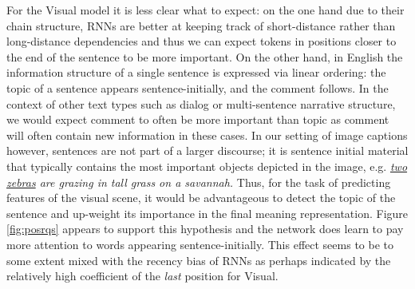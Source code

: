 For the {\sc Visual} model it is less clear what to
expect: on the one hand due to their chain structure,
RNNs are better at keeping track of
short-distance rather than long-distance dependencies and thus we can expect
tokens in positions closer to the end of the sentence to be more important.
On the other hand, in English the information structure of a single
sentence is expressed via linear ordering: the {\sc topic} of a
sentence appears sentence-initially, and the {\sc comment} follows.
In the context of other text types such as dialog or multi-sentence \label{edit:topiccomment}
narrative structure, we would expect {\sc comment} to often be more
important than {\sc topic} as {\sc comment} will often
contain new information in these cases. In our setting of image captions
however, sentences are not part of a larger discourse; it is sentence
initial material that typically contains the most important
objects depicted in the image, e.g. {\it {\underline{two zebras}} are grazing in tall grass on a savannah.}
Thus, for the task of predicting features of the visual scene, it would
be advantageous to detect the topic of the sentence and up-weight its
importance in the final meaning representation. Figure \ref{fig:posrqs}
appears to support this hypothesis and the network does
learn to pay more attention to  words appearing
sentence-initially. This effect seems to be to some extent mixed with the recency
bias of RNNs as perhaps indicated by the relatively high coefficient of the {\it last}
position for {\sc Visual}.
